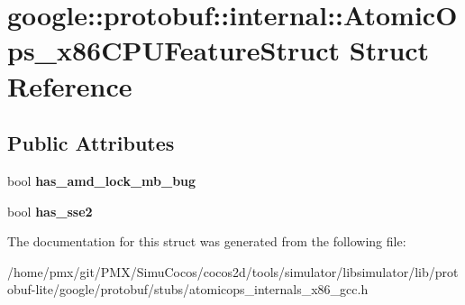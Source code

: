 \hypertarget{structgoogle_1_1protobuf_1_1internal_1_1AtomicOps__x86CPUFeatureStruct}{}\section{google\+:\+:protobuf\+:\+:internal\+:\+:Atomic\+Ops\+\_\+x86\+C\+P\+U\+Feature\+Struct Struct Reference}
\label{structgoogle_1_1protobuf_1_1internal_1_1AtomicOps__x86CPUFeatureStruct}
\subsection*{Public Attributes}
\begin{DoxyCompactItemize}
\item 
\mbox{\label{structgoogle_1_1protobuf_1_1internal_1_1AtomicOps__x86CPUFeatureStruct_afac1923022366eabee0fd725296d5596}} 
bool {\bfseries has\+\_\+amd\+\_\+lock\+\_\+mb\+\_\+bug}
\item 
\mbox{\label{structgoogle_1_1protobuf_1_1internal_1_1AtomicOps__x86CPUFeatureStruct_a0f56d9e2f8a857418f34fd3aceb23fbd}} 
bool {\bfseries has\+\_\+sse2}
\end{DoxyCompactItemize}


The documentation for this struct was generated from the following file\+:\begin{DoxyCompactItemize}
\item 
/home/pmx/git/\+P\+M\+X/\+Simu\+Cocos/cocos2d/tools/simulator/libsimulator/lib/protobuf-\/lite/google/protobuf/stubs/atomicops\+\_\+internals\+\_\+x86\+\_\+gcc.\+h\end{DoxyCompactItemize}
